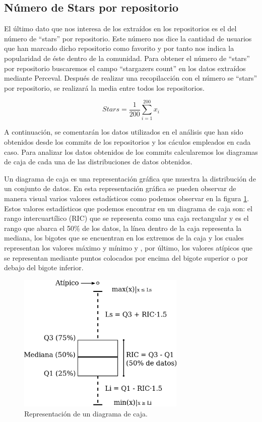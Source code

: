 \documentclass[a4paper, 12pt]{book}
\begin{document}
\subsection{Número de Stars por repositorio} %
\label{sec:número de Stars por repositorio}

El último dato que nos interesa de los extraídos en los repositorios es el del número de ``stars'' por repositorio.
Este número nos dice la cantidad de usuarios que han marcado dicho repositorio como favorito y por tanto nos indica la popularidad de éste dentro de la comunidad. 
Para obtener el número  de ``stars'' por repositorio buscaremos el campo ``stargazers count'' en los datos extraídos mediante Perceval. 
Después de realizar una recopilacción con el número se ``stars'' por repositorio, se realizará la media entre todos los repositorios.

\[{Stars} = \frac{1}{200} \sum_{i=1}^{200} x_i\]



A continuación, se comentarán los datos utilizados en el análisis que han sido obtenidos desde los commits de los repositorios y los cáculos empleados en cada caso.
Para analizar los datos obtenidos de los commits calcularemos los diagramas de caja de cada una de las distribuciones de datos obtenidos.


Un diagrama de caja es una representación gráfica que muestra la distribución de un conjunto de datos.
En esta representación gráfica se pueden observar de manera visual varios valores estadísticos como podemos observar en la figura \ref{fig:boxplot}.
Estos valores estadísticos que podemos encontrar en un diagrama de caja son: el rango intercuartílico (RIC) que se representa como una caja rectangular y es el rango que abarca el 50\% de los datos, la línea dentro de la caja representa la mediana, 
los bigotes que se encuentran en los extremos de la caja y los cuales representan los valores máximo y mínimo y , por último, los valores atípicos que se representan mediante puntos colocados por encima del bigote superior o por debajo del bigote inferior.

\begin{figure}
  \centering
  \includegraphics[width=8cm, keepaspectratio]{img/Boxplot.png}
  \caption{Representación de un diagrama de caja.}\label{fig:boxplot}
\end{figure}
\end{document}
